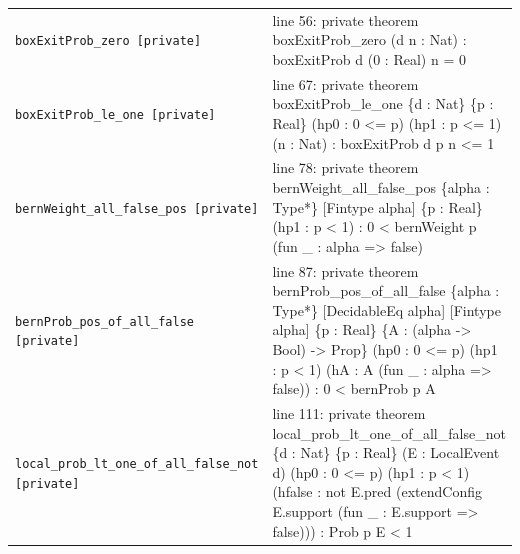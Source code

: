 \documentclass[10pt]{article}
\begin{document}
\begin{longtable}{>{\raggedright\arraybackslash}p{} >{\raggedright\arraybackslash}p{}}
\texttt{boxExitProb\_\allowbreak{}zero [private]} & {\ttfamily\scriptsize line 56:\allowbreak{} private theorem boxExitProb\_\allowbreak{}zero (\allowbreak{}d n :\allowbreak{} Nat)\allowbreak{} :\allowbreak{} boxExitProb d (\allowbreak{}0 :\allowbreak{} Real)\allowbreak{} n =\allowbreak{} 0} \\[0.45em]
\texttt{boxExitProb\_\allowbreak{}le\_\allowbreak{}one [private]} & {\ttfamily\scriptsize line 67:\allowbreak{} private theorem boxExitProb\_\allowbreak{}le\_\allowbreak{}one \{d :\allowbreak{} Nat\} \{p :\allowbreak{} Real\} (\allowbreak{}hp0 :\allowbreak{} 0 <=\allowbreak{} p)\allowbreak{} (\allowbreak{}hp1 :\allowbreak{} p <=\allowbreak{} 1)\allowbreak{} (\allowbreak{}n :\allowbreak{} Nat)\allowbreak{} :\allowbreak{} boxExitProb d p n <=\allowbreak{} 1} \\[0.45em]
\texttt{bernWeight\_\allowbreak{}all\_\allowbreak{}false\_\allowbreak{}pos [private]} & {\ttfamily\scriptsize line 78:\allowbreak{} private theorem bernWeight\_\allowbreak{}all\_\allowbreak{}false\_\allowbreak{}pos \{alpha :\allowbreak{} Type*\allowbreak{}\} [Fintype alpha] \{p :\allowbreak{} Real\} (\allowbreak{}hp1 :\allowbreak{} p < 1)\allowbreak{} :\allowbreak{} 0 < bernWeight p (\allowbreak{}fun \_\allowbreak{} :\allowbreak{} alpha =\allowbreak{}> false)\allowbreak{}} \\[0.45em]
\texttt{bernProb\_\allowbreak{}pos\_\allowbreak{}of\_\allowbreak{}all\_\allowbreak{}false [private]} & {\ttfamily\scriptsize line 87:\allowbreak{} private theorem bernProb\_\allowbreak{}pos\_\allowbreak{}of\_\allowbreak{}all\_\allowbreak{}false \{alpha :\allowbreak{} Type*\allowbreak{}\} [DecidableEq alpha] [Fintype alpha] \{p :\allowbreak{} Real\} \{A :\allowbreak{} (\allowbreak{}alpha -\allowbreak{}> Bool)\allowbreak{} -\allowbreak{}> Prop\} (\allowbreak{}hp0 :\allowbreak{} 0 <=\allowbreak{} p)\allowbreak{} (\allowbreak{}hp1 :\allowbreak{} p < 1)\allowbreak{} (\allowbreak{}hA :\allowbreak{} A (\allowbreak{}fun \_\allowbreak{} :\allowbreak{} alpha =\allowbreak{}> false)\allowbreak{})\allowbreak{} :\allowbreak{} 0 < bernProb p A} \\[0.45em]
\texttt{local\_\allowbreak{}prob\_\allowbreak{}lt\_\allowbreak{}one\_\allowbreak{}of\_\allowbreak{}all\_\allowbreak{}false\_\allowbreak{}not [private]} & {\ttfamily\scriptsize line 111:\allowbreak{} private theorem local\_\allowbreak{}prob\_\allowbreak{}lt\_\allowbreak{}one\_\allowbreak{}of\_\allowbreak{}all\_\allowbreak{}false\_\allowbreak{}not \{d :\allowbreak{} Nat\} \{p :\allowbreak{} Real\} (\allowbreak{}E :\allowbreak{} LocalEvent d)\allowbreak{} (\allowbreak{}hp0 :\allowbreak{} 0 <=\allowbreak{} p)\allowbreak{} (\allowbreak{}hp1 :\allowbreak{} p < 1)\allowbreak{} (\allowbreak{}hfalse :\allowbreak{} not E.\allowbreak{}pred (\allowbreak{}extendConfig E.\allowbreak{}support (\allowbreak{}fun \_\allowbreak{} :\allowbreak{} E.\allowbreak{}support =\allowbreak{}> false)\allowbreak{})\allowbreak{})\allowbreak{} :\allowbreak{} Prob p E < 1} \\[0.45em]

\end{longtable}
\end{document}
